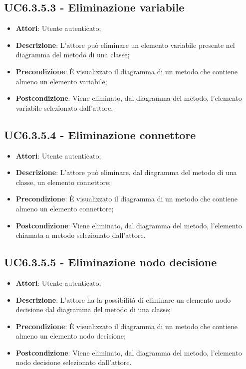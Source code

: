 \subsection{UC6.3.5.3 - Eliminazione variabile} 
\label{ssec:UC6.3.5.3} 
\begin{itemize} 
\item \textbf{Attori}: Utente autenticato;
\item \textbf{Descrizione}: L'attore può eliminare un elemento variabile presente nel diagramma del metodo di una classe;
\item \textbf{Precondizione}: È visualizzato il diagramma di un metodo che contiene almeno un elemento variabile;
\item \textbf{Postcondizione}: Viene eliminato, dal diagramma del metodo,  l'elemento variabile selezionato dall'attore.
\end{itemize} 
\subsection{UC6.3.5.4 - Eliminazione connettore} 
\label{ssec:UC6.3.5.4} 
\begin{itemize} 
\item \textbf{Attori}: Utente autenticato;
\item \textbf{Descrizione}: L'attore può eliminare, dal diagramma del metodo di una classe, un elemento connettore;
\item \textbf{Precondizione}: È visualizzato il diagramma di un metodo che contiene almeno un elemento connettore;
\item \textbf{Postcondizione}: Viene eliminato, dal diagramma del metodo,  l'elemento chiamata a metodo selezionato dall'attore.
\end{itemize} 
\subsection{UC6.3.5.5 - Eliminazione nodo decisione} 
\label{ssec:UC6.3.5.5} 
\begin{itemize} 
\item \textbf{Attori}: Utente autenticato;
\item \textbf{Descrizione}: L'attore ha la possibilità di eliminare un elemento nodo decisione dal diagramma del metodo di una classe;
\item \textbf{Precondizione}: È visualizzato il diagramma di un metodo che contiene almeno un elemento nodo decisione;
\item \textbf{Postcondizione}: Viene eliminato, dal diagramma del metodo,  l'elemento nodo decisione selezionato dall'attore.
\end{itemize} 

